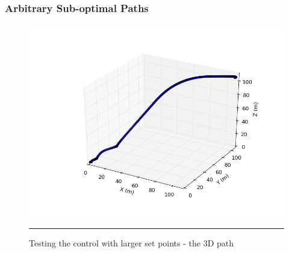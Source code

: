 \documentclass{beamer}
\begin{document}

\begin{frame}
\frametitle{Arbitrary Sub-optimal Paths}
\begin{figure}[htbp]
    \centering
        \includegraphics[width=\textwidth]{Figures/largeSetpointDifferencesTest_3d.png}
        \rule{35em}{0.5pt}
    \caption[largeSetpointDifferencesTest3D path]{Testing the control with larger set points - the 3D path}
    \label{fig:largeSetpointDifferencesTest3D path}
\end{figure}

\end{frame}



\end{document}
